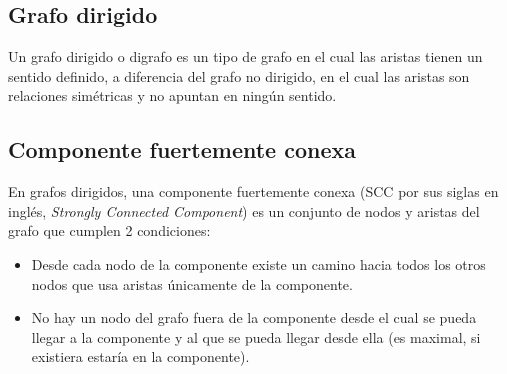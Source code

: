 \subsection{Grafo dirigido}

Un grafo dirigido o digrafo es un tipo de grafo en el cual las aristas tienen un sentido definido, a 
diferencia del grafo no dirigido, en el cual las aristas son relaciones simétricas y no apuntan en ningún 
sentido. 

\subsection{Componente fuertemente conexa}

En grafos dirigidos, una componente fuertemente conexa (SCC por sus siglas en inglés, \emph{Strongly Connected Component}) es un conjunto de nodos y aristas del grafo que cumplen 2 condiciones:

\begin{itemize}
	\item Desde cada nodo de la componente existe un camino hacia todos los otros nodos que usa aristas únicamente de la componente.
	\item No hay un nodo del grafo fuera de la componente desde el cual se pueda llegar a la componente y al que se pueda llegar desde ella (es maximal, si existiera estaría en la componente).
\end{itemize} 